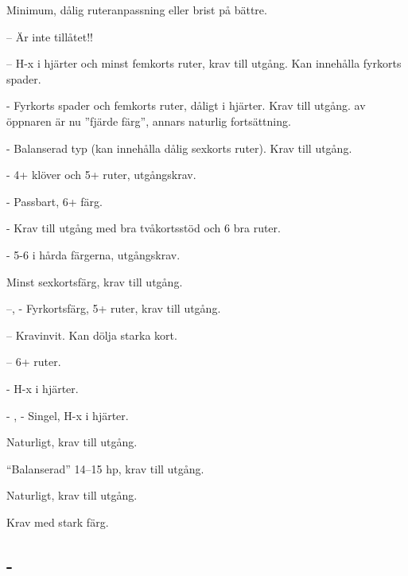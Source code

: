 \begin{beskriv}
   \item[\ru{2}] Minimum, dålig ruteranpassning eller brist på bättre.
   \begin{beskriv}
	\item[--\pass] Är inte tillåtet!!
	\item[--\hj{2}] H-x i hjärter och minst femkorts ruter, krav till
                        utgång. Kan innehålla fyrkorts spader.
	\item[- \spa{2}] Fyrkorts spader och femkorts ruter, dåligt i
                       hjärter. Krav till utgång.
			 av öppnaren är nu ''fjärde färg'', annars
			naturlig fortsättning.
	\item[- \NT{2}] Balanserad typ (kan innehålla dålig sexkorts
                        ruter). Krav till utgång.
	\item[- \kl{3}] 4+ klöver och 5+ ruter, utgångskrav.
	\item[- \ru{3}] Passbart, 6+ färg.
	\item[- \hj{3}] Krav till utgång med bra tvåkortsstöd och 6 bra ruter.
	\item[- \spa{3}] 5-6 i hårda färgerna, utgångskrav.
   \end{beskriv}
   \item[\hj{2}] Minst sexkortsfärg, krav till utgång.
		\begin{beskriv}
		   \item[--\spa{2}, - \kl{3}] Fyrkortsfärg, 5+ ruter,
			krav till utgång.
		   \item[--\NT{2}] Kravinvit. Kan dölja starka kort.
		   \item[--\ru{3}] 6+ ruter. 
		   \item[- \hj{3}] H-x i hjärter.
		   \item[- \spa{3}, - \kl{4}] Singel, H-x i hjärter.
		\end{beskriv}
   \item[\spa{2}] Naturligt, krav till utgång.
   \item[\NT{2}] ``Balanserad'' 14--15 hp, krav till utgång.
   \item[\la{3}] Naturligt, krav till utgång.
   \item[\hj{3}] Krav med stark färg.
\end{beskriv}

\subsection{ - }

